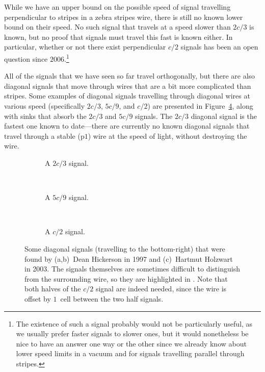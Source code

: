 While we have an upper bound on the possible speed of signal travelling perpendicular to stripes in a zebra stripes wire, there is still no known lower bound on their speed. No such signal that travels at a speed slower than $2c/3$ is known, but no proof that signals must travel this fast is known either. In particular, whether or not there exist perpendicular $c/2$ signals has been an open question since $2006$.\footnote{The existence of such a signal probably would not be particularly useful, as we usually prefer faster signals to slower ones, but it would nonetheless be nice to have an answer one way or the other since we already know about lower speed limits in a vacuum and for signals travelling parallel through stripes.}

All of the signals that we have seen so far travel orthogonally, but there are also diagonal signals that move through wires that are a bit more complicated than stripes. Some examples of diagonal signals travelling through diagonal wires at various speed (specifically $2c/3$, $5c/9$, and $c/2$) are presented in Figure~\ref{fig:diagonal_signals}, along with sinks that absorb the $2c/3$ and $5c/9$ signals. The $2c/3$ diagonal signal is the fastest one known to date---there are currently no known diagonal signals that travel through a stable (p$1$) wire at the speed of light, without destroying the wire.

\begin{figure}[!htb]
	\centering
	\begin{subfigure}{.31\textwidth}
		\centering{}
		\caption{A $2c/3$ signal.}\label{fig:diagonal_2c3_signal}
	\end{subfigure} \ \ \ \ %
	\begin{subfigure}{.31\textwidth}
		\centering{}
		\caption{A $5c/9$ signal.}\label{fig:diagonal_5c9_signal}
	\end{subfigure} \ \ \ \ %
	\begin{subfigure}{.31\textwidth}
		\centering{}
		\caption{A $c/2$ signal.}\label{fig:diagonal_c2_signal}
	\end{subfigure}
	\caption{Some diagonal signals (travelling to the bottom-right) that were found by (a,b)~Dean Hickerson in 1997 and (c)~Hartmut Holzwart in 2003. The signals themselves are sometimes difficult to distinguish from the surrounding wire, so they are highlighted in . Note that both halves of the $c/2$ signal are indeed needed, since the wire is offset by $1$~cell between the two half signals.}\label{fig:diagonal_signals}
\end{figure}

